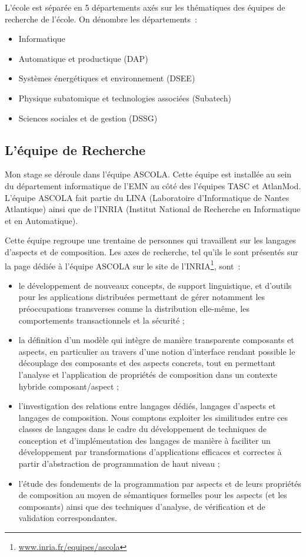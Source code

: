 \documentclass[a4paper, 11pt]{report}
\begin{document}
L’école est séparée en 5 départements axés sur les thématiques des équipes de recherche de l'école. On dénombre les départements~:
\begin{itemize}
	\item Informatique
	\item Automatique et productique (DAP)
	\item Systèmes énergétiques et environnement (DSEE)
	\item Physique subatomique et technologies associées (Subatech)
	\item Sciences sociales et de gestion (DSSG)
\end{itemize}

		\subsection{L'équipe de Recherche}
Mon stage se déroule dans l'équipe ASCOLA. Cette équipe est installée au sein du département informatique de l’EMN au côté des l'équipes TASC et AtlanMod. L'équipe ASCOLA fait partie du LINA (Laboratoire d'Informatique de Nantes Atlantique) ainsi que de l'INRIA (Institut National de Recherche en Informatique et en Automatique).

Cette équipe regroupe une trentaine de personnes qui travaillent sur les langages d'aspects et de composition. Les axes de recherche, tel qu'ils le sont présentés sur la page dédiée à l'équipe ASCOLA sur le site de l'INRIA\footnote{\href{http://www.inria.fr/equipes/ascola}{www.inria.fr/equipes/ascola}}, sont~:
\begin{itemize}
	\item le développement de nouveaux concepts, de support linguistique, et d'outils pour les applications distribuées permettant de gérer notamment les préoccupations transverses comme la distribution elle-même, les comportements transactionnels et la sécurité ;
	\item la définition d'un modèle qui intègre de manière transparente composants et aspects, en particulier au travers d'une notion d'interface rendant possible le découplage des composants et des aspects concrets, tout en permettant l'analyse et l'application de propriétés de composition dans un contexte hybride composant/aspect ;
	\item l'investigation des relations entre langages dédiés, langages d'aspects et langages de composition. Nous comptons exploiter les similitudes entre ces classes de langages dans le cadre du développement de techniques de conception et d'implémentation des langages de manière à faciliter un développement par transformations d'applications efficaces et correctes à partir d'abstraction de programmation de haut niveau ;
	\item l'étude des fondements de la programmation par aspects et de leurs propriétés de composition au moyen de sémantiques formelles pour les aspects (et les composants) ainsi que des techniques d'analyse, de vérification et de validation correspondantes.
\end{itemize}
\end{document}
